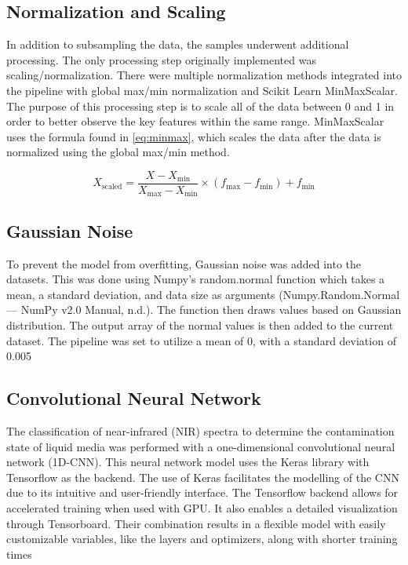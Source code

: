\documentclass[12pt]{report}
\renewcommand{\cite}{\supercite}
\begin{document}
\subsection{Normalization and Scaling}
In addition to subsampling the data, the samples underwent additional processing. The only processing step originally implemented was scaling/normalization. There were multiple normalization methods integrated into the pipeline with global max/min normalization and Scikit Learn MinMaxScalar. The purpose of this processing step is to scale all of the data between 0 and 1 in order to better observe the key features within the same range. MinMaxScalar uses the formula found in \autoref{eq:minmax}, which scales the data after the data is normalized using the global max/min method. 

\begin{equation}
    X_{\text{scaled}} = \frac{X - X_{\text{min}}}{X_{\text{max}} - X_{\text{min}}} \times (f_{\text{max}} - f_{\text{min}}) + f_{\text{min}}
    \label{eq:minmax}
\end{equation}

\subsection{Gaussian Noise}
To prevent the model from overfitting, Gaussian noise was added into the datasets. This was done using Numpy’s random.normal function which takes a mean, a standard deviation, and data size as arguments (Numpy.Random.Normal — NumPy v2.0 Manual, n.d.). The function then draws values based on Gaussian distribution. The output array of the normal values is then added to the current dataset. The pipeline was set to utilize a mean of 0, with a standard deviation of 0.005

\subsection{Convolutional Neural Network}

The classification of near-infrared (NIR) spectra to determine the contamination state of liquid media was performed with a one-dimensional convolutional neural network (1D-CNN). This neural network model uses the Keras library with Tensorflow as the backend. The use of Keras facilitates the modelling of the CNN due to its intuitive and user-friendly interface.\cite{kerasteam_keras} The Tensorflow backend allows for accelerated training when used with GPU.\cite{acecloudteam_2024_tensorflow} It also enables a detailed visualization through Tensorboard. Their combination results in a flexible model with easily customizable variables, like the layers and optimizers, along with shorter training times	
\end{document}
